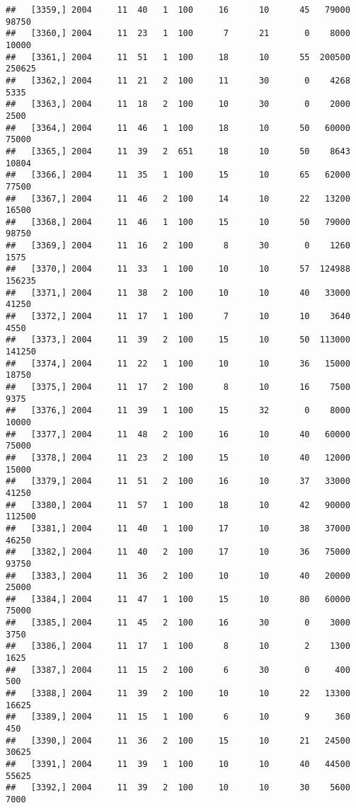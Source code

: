 \documentclass{article}\usepackage[]{graphicx}\usepackage[]{color}
\makeatletter
\newenvironment{kframe}{%
 \def\at@end@of@kframe{}%
 \ifinner\ifhmode%
  \def\at@end@of@kframe{\end{minipage}}%
  \begin{minipage}{\columnwidth}%
 \fi\fi%
 \def\FrameCommand##1{\hskip\@totalleftmargin \hskip-\fboxsep
 \colorbox{shadecolor}{##1}\hskip-\fboxsep
     \hskip-\linewidth \hskip-\@totalleftmargin \hskip\columnwidth}%
 \MakeFramed {\advance\hsize-\width
   \@totalleftmargin\z@ \linewidth\hsize
   \@setminipage}}%
 {\par\unskip\endMakeFramed%
 \at@end@of@kframe}
\newenvironment{knitrout}{}{} %
\makeatother
\begin{document}
\begin{knitrout}
\begin{kframe}
\begin{verbatim}
##   [3359,] 2004     11  40   1  100     16      10      45   79000   98750
##   [3360,] 2004     11  23   1  100      7      21       0    8000   10000
##   [3361,] 2004     11  51   1  100     18      10      55  200500  250625
##   [3362,] 2004     11  21   2  100     11      30       0    4268    5335
##   [3363,] 2004     11  18   2  100     10      30       0    2000    2500
##   [3364,] 2004     11  46   1  100     18      10      50   60000   75000
##   [3365,] 2004     11  39   2  651     18      10      50    8643   10804
##   [3366,] 2004     11  35   1  100     15      10      65   62000   77500
##   [3367,] 2004     11  46   2  100     14      10      22   13200   16500
##   [3368,] 2004     11  46   1  100     15      10      50   79000   98750
##   [3369,] 2004     11  16   2  100      8      30       0    1260    1575
##   [3370,] 2004     11  33   1  100     10      10      57  124988  156235
##   [3371,] 2004     11  38   2  100     10      10      40   33000   41250
##   [3372,] 2004     11  17   1  100      7      10      10    3640    4550
##   [3373,] 2004     11  39   2  100     15      10      50  113000  141250
##   [3374,] 2004     11  22   1  100     10      10      36   15000   18750
##   [3375,] 2004     11  17   2  100      8      10      16    7500    9375
##   [3376,] 2004     11  39   1  100     15      32       0    8000   10000
##   [3377,] 2004     11  48   2  100     16      10      40   60000   75000
##   [3378,] 2004     11  23   2  100     15      10      40   12000   15000
##   [3379,] 2004     11  51   2  100     16      10      37   33000   41250
##   [3380,] 2004     11  57   1  100     18      10      42   90000  112500
##   [3381,] 2004     11  40   1  100     17      10      38   37000   46250
##   [3382,] 2004     11  40   2  100     17      10      36   75000   93750
##   [3383,] 2004     11  36   2  100     10      10      40   20000   25000
##   [3384,] 2004     11  47   1  100     15      10      80   60000   75000
##   [3385,] 2004     11  45   2  100     16      30       0    3000    3750
##   [3386,] 2004     11  17   1  100      8      10       2    1300    1625
##   [3387,] 2004     11  15   2  100      6      30       0     400     500
##   [3388,] 2004     11  39   2  100     10      10      22   13300   16625
##   [3389,] 2004     11  15   1  100      6      10       9     360     450
##   [3390,] 2004     11  36   2  100     15      10      21   24500   30625
##   [3391,] 2004     11  39   1  100     10      10      40   44500   55625
##   [3392,] 2004     11  39   2  100     10      10      30    5600    7000

\end{verbatim}
\end{kframe}
\end{knitrout}
\end{document}
